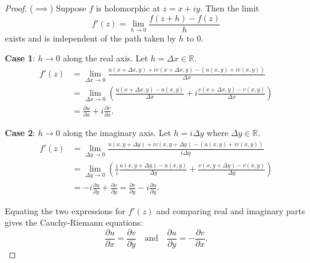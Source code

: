 \begin{proof}
  ($\implies$) Suppose $f$ is holomorphic at $z = x+iy$. Then the limit
  \[
    f'(z) = \lim_{h \to 0} \frac{f(z+h) - f(z)}{h}
  \]
  exists and is independent of the path taken by $h$ to $0$.

  \textbf{Case 1}: $h \to 0$ along the real axis. Let $h = \Delta x \in \mathbb{R}$.
  \begin{align*}
    f'(z) & = \lim_{\Delta x \to 0} \frac{u(x+\Delta x, y) + i v(x+\Delta x, y) - (u(x,y) + i v(x,y))}{\Delta x}                             \\
          & = \lim_{\Delta x \to 0} \left( \frac{u(x+\Delta x, y) - u(x,y)}{\Delta x} + i \frac{v(x+\Delta x, y) - v(x,y)}{\Delta x} \right) \\
          & = \frac{\partial u}{\partial x} + i \frac{\partial v}{\partial x}.
  \end{align*}

  \textbf{Case 2}: $h \to 0$ along the imaginary axis. Let $h = i\Delta y$ where $\Delta y \in \mathbb{R}$.
  \begin{align*}
    f'(z) & = \lim_{\Delta y \to 0} \frac{u(x, y+\Delta y) + i v(x, y+\Delta y) - (u(x,y) + i v(x,y))}{i\Delta y}                                      \\
          & = \lim_{\Delta y \to 0} \left( \frac{1}{i} \frac{u(x, y+\Delta y) - u(x,y)}{\Delta y} + \frac{v(x, y+\Delta y) - v(x,y)}{\Delta y} \right) \\
          & = -i \frac{\partial u}{\partial y} + \frac{\partial v}{\partial y} = \frac{\partial v}{\partial y} - i \frac{\partial u}{\partial y}.
  \end{align*}

  Equating the two expressions for $f'(z)$ and comparing real and imaginary parts gives the Cauchy-Riemann equations:
  \[
    \frac{\partial u}{\partial x} = \frac{\partial v}{\partial y}
    \quad \text{and} \quad
    \frac{\partial u}{\partial y} = -\frac{\partial v}{\partial x}.
  \]



\end{proof}
